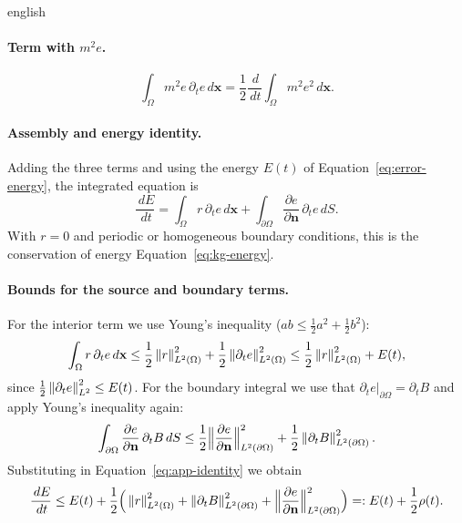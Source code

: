 \documentclass[0000.tex]{subfiles}
\begin{document}
\begin{hyphenrules}{english}
\paragraph{Term with $m^2e$.}
\[
  \int_\Omega m^2e\,\partial_te\,d\mathbf{x}=\frac12\frac{\,d}{\,d t}\int_\Omega m^2e^2\,d\mathbf{x}.
\]

\paragraph{Assembly and energy identity.}
Adding the three terms and using the energy $E(t)$ of Equation~\eqref{eq:error-energy}, the integrated equation is
\begin{equation}
  \frac{\,d E}{\,d t}=\int_\Omega r\,\partial_te\,d\mathbf{x}+\int_{\partial\Omega}\frac{\partial e}{\partial\mathbf{n}}\,\partial_te\,d S.
  \label{eq:app-identity}
\end{equation}
With $r=0$ and periodic or homogeneous boundary conditions, this is the conservation of energy
Equation~\eqref{eq:kg-energy}.

\paragraph{Bounds for the source and boundary terms.}
For the interior term we use Young's inequality ($ab\le\frac12a^2+\frac12b^2$):
\[
  \int_\Omega r\,\partial_te\,d\mathbf{x}\le\frac12\left\lVert r \right\rVert^2_{L^2(\Omega)}+\frac12\left\lVert \partial_te \right\rVert^2_{L^2(\Omega)}
  \le\frac12\left\lVert r \right\rVert^2_{L^2(\Omega)}+E(t),
\]
since $\frac12\left\lVert \partial_te \right\rVert^2_{L^2}\le E(t)$. For the boundary integral we use that
$\partial_te|_{\partial\Omega}=\partial_tB$ and apply Young's inequality again:
\[
  \int_{\partial\Omega}\frac{\partial e}{\partial\mathbf{n}}\,\partial_tB\,d S
  \le\frac12\Big\|\frac{\partial e}{\partial\mathbf{n}}\Big\|^2_{L^2(\partial\Omega)}+\frac12\left\lVert \partial_tB \right\rVert^2_{L^2(\partial\Omega)}.
\]
Substituting in Equation~\eqref{eq:app-identity} we obtain
\begin{equation}
  \frac{\,d E}{\,d t}\le E(t)+\frac12\Big(\left\lVert r \right\rVert^2_{L^2(\Omega)}+\left\lVert \partial_tB \right\rVert^2_{L^2(\partial\Omega)}
  +\Big\|\frac{\partial e}{\partial\mathbf{n}}\Big\|^2_{L^2(\partial\Omega)}\Big)=:E(t)+\frac12\rho(t).
  \label{eq:app-differential}
\end{equation}


\end{hyphenrules}
\end{document}
